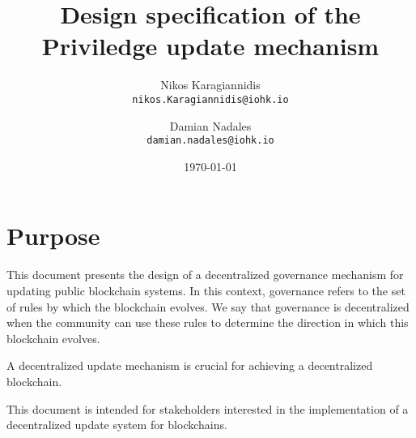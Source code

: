 \documentclass[11pt,a4paper]{article}
\begin{document}

\title{
  Design specification of the Priviledge update mechanism\\
}

\author{
  Nikos Karagiannidis\\
  {\small \texttt{nikos.Karagiannidis@iohk.io}}\\
  \and
  Damian Nadales \\
  {\small \texttt{damian.nadales@iohk.io}}\\
}

\date{\today}

\maketitle

\begin{abstract}

\end{abstract}

\tableofcontents
\listoffigures
\listoftables

\section{Purpose}
\label{sec:purpose}

This document presents the design of a decentralized governance mechanism for
updating public blockchain systems.
In this context, governance refers to the set of rules by which the blockchain
evolves.
We say that governance is decentralized when the community can use these rules
to determine the direction in which this blockchain evolves.


A decentralized update mechanism is crucial for achieving a decentralized
blockchain.


This document is intended for stakeholders interested in the implementation of a
decentralized update system for blockchains.
\end{document}
